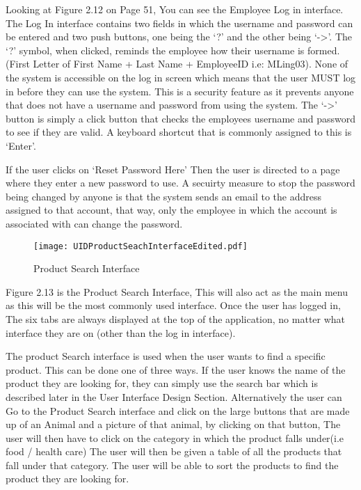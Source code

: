 \begin{flushleft}
Looking at Figure 2.12 on Page 51, You can see the Employee Log in interface. The Log In interface contains two fields in which the username and password can be entered and two push buttons, one being the `?' and the other being `->'. The `?' symbol, when clicked, reminds the employee how their username is formed. (First Letter of First Name + Last Name + EmployeeID i.e: MLing03). None of the system is accessible on the log in screen which means that the user MUST log in before they can use the system. This is a security feature as it prevents anyone that does not have a username and password from using the system. The `->' button is simply a click button that checks the employees username and password to see if they are valid. A keyboard shortcut that is commonly assigned to this is `Enter'. \par

If the user clicks on `Reset Password Here' Then the user is directed to a page where they enter a new password to use. A secuirty measure to stop the password being changed by anyone is that the system sends an email to the address assigned to that account, that way, only the employee in which the account is associated with can change the password. \par

\end{flushleft}

\begin{figure}[H]
\caption{Product Search Interface} \label{fig: Product Search Interface}
\hfill\texttt{[image: UIDProductSeachInterfaceEdited.pdf]}\hspace*{\fill}
\end{figure}

Figure 2.13 is the Product Search Interface, This will also act as the main menu as this will be the most commonly used interface. Once the user has logged in, The six tabs are always displayed at the top of the application, no matter what interface they are on (other than the log in interface). \par

The product Search interface is used when the user wants to find a specific product. This can be done one of three ways. If the user knows the name of the product they are looking for, they can simply use the search bar which is described later in the User Interface Design Section. Alternatively the user can Go to the Product Search interface and click on the large buttons that are made up of an Animal and a picture of that animal, by clicking on that button, The user will then have to click on the category in which the product falls under(i.e food / health care) The user will then be given a table of all the products that fall under that category. The user will be able to sort the products to find the product they are looking for. \par


